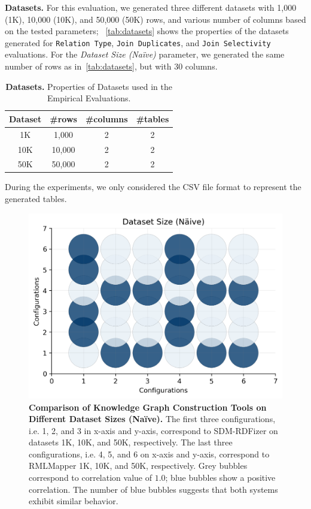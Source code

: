 \noindent \textbf{Datasets.}
For this evaluation, we generated three different datasets with 1,000 (1K), 10,000 (10K), and 50,000 (50K) rows, and various number of columns based on the tested parameters; ~\autoref{tab:datasets} shows the properties of the datasets generated for \texttt{Relation Type}, \texttt{Join Duplicates}, and \texttt{Join Selectivity} evaluations. 
For the \textit{Dataset Size (Na{\"i}ve)} parameter, we generated the same number of rows as in~\autoref{tab:datasets}, but with $30$ columns.
\begin{table}[!tb]
    \centering
    \caption[Testbeds for Analyzing the Impact over KGC engines]{\textbf{Datasets.} Properties of Datasets used in the Empirical Evaluations.}
    \label{tab:datasets}
    \begin{tabular}{|c|c|c|c|}
    \hline
     Dataset & \#rows & \#columns & \#tables \\ \hline
     1K & 1,000 & 2 & 2 \\ \hline 
     10K & 10,000 & 2 & 2 \\ \hline 
     50K & 50,000 & 2 & 2 \\ \hline 
     \end{tabular}
\end{table}
%
During the experiments, we only considered the CSV file format to represent the generated tables.

\begin{figure}[!tb]
    \centering
    \includegraphics[width=0.8\columnwidth]{figures/naive_allk_bubble.png}
    \caption[Knowledge Graph Construction Tools on Different Dataset Sizes (Na{\"i}ve)]{\textbf{Comparison of Knowledge Graph Construction Tools on Different Dataset Sizes (Na{\"i}ve).} The first three configurations, i.e. 1, 2, and 3 in x-axis and y-axis, correspond to SDM-RDFizer on datasets 1K, 10K, and 50K, respectively. The last three configurations, i.e. 4, 5, and 6 on x-axis and y-axis, correspond to RMLMapper 1K, 10K, and 50K, respectively. Grey bubbles correspond to correlation value of $1.0$; blue bubbles show a positive correlation. The number of blue bubbles suggests that both systems exhibit similar behavior.}
    \label{fig:naive_bubble}
\end{figure}

